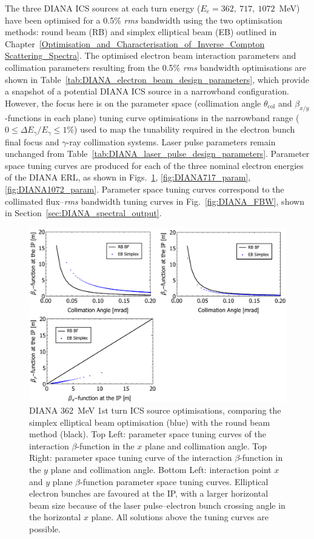 \documentclass[../main.tex]{subfiles}
\begin{document}
The three DIANA ICS sources at each turn energy ($E_{e}= 362,~717,~1072$~\si{\mega\electronvolt}) have been optimised for a 0.5\% \textit{rms} bandwidth using the two optimisation methods: round beam (RB) and simplex elliptical beam (EB) outlined in Chapter~\ref{Optimisation_and_Characterisation_of_Inverse_Compton Scattering_Spectra}. The optimised electron beam interaction parameters and collimation parameters resulting from the 0.5\% \textit{rms} bandwidth optimisations are shown in Table~\ref{tab:DIANA_electron_beam_design_parameters}, which provide a snapshot of a potential DIANA ICS source in a narrowband configuration. However, the focus here is on the parameter space (collimation angle $\theta_{\mathrm{col}}$ and $\beta_{x/y}$-functions in each plane) tuning curve optimisations in the narrowband range ($0 \leq \Delta E_{\gamma}/E_{\gamma} \leq 1$\%) used to map the tunability required in the electron bunch final focus and $\gamma$-ray collimation systems. Laser pulse parameters remain unchanged from Table~\ref{tab:DIANA_laser_pulse_design_parameters}. Parameter space tuning curves are produced for each of the three nominal electron energies of the DIANA ERL, as shown in Figs.~\ref{fig:DIANA362_param}, \ref{fig:DIANA717_param}, \ref{fig:DIANA1072_param}. Parameter space tuning curves correspond to the collimated flux--\textit{rms} bandwidth tuning curves in Fig.~\ref{fig:DIANA_FBW}, shown in Section~\ref{sec:DIANA_spectral_output}.
\begin{figure}[!h]
\centering
\includegraphics[width=\textwidth]{Figures/DIANA_Inverse_Compton_Source_Design/DIANA362param.pdf}
\caption{DIANA 362~\si{\mega\electronvolt} 1st turn ICS source optimisations, comparing the simplex elliptical beam optimisation (blue) with the round beam method (black). Top Left: parameter space tuning curves of the interaction $\beta$-function in the $x$ plane and collimation angle. Top Right: parameter space tuning curve of the interaction $\beta$-function in the $y$ plane and collimation angle. Bottom Left: interaction point $x$ and $y$ plane $\beta$-function parameter space tuning curves. Elliptical electron bunches are favoured at the IP, with a larger horizontal beam size because of the laser pulse--electron bunch crossing angle in the horizontal $x$ plane. All solutions above the tuning curves are possible.}
\label{fig:DIANA362_param}
\end{figure}
\end{document}
